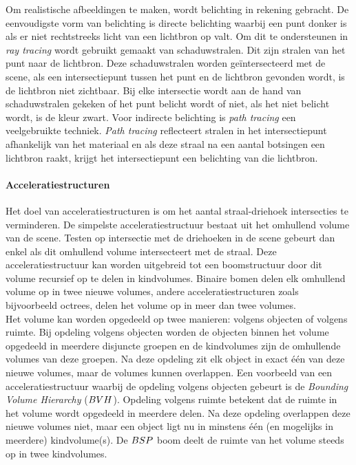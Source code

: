     Om realistische afbeeldingen te maken, wordt belichting in rekening gebracht. De eenvoudigste vorm van belichting is directe belichting waarbij een punt donker is als er niet rechtstreeks licht van een lichtbron op valt. Om dit te ondersteunen in \textit{ray tracing} wordt gebruikt gemaakt van schaduwstralen. Dit zijn stralen van het punt naar de lichtbron.  Deze schaduwstralen worden geïntersecteerd met de scene, als een intersectiepunt tussen het punt en de lichtbron gevonden wordt, is de lichtbron niet zichtbaar.  Bij elke intersectie wordt aan de hand van schaduwstralen gekeken of het punt belicht wordt of niet, als het niet belicht wordt, is de kleur zwart. Voor indirecte belichting is \textit{path tracing} een veelgebruikte techniek. \textit{Path tracing} reflecteert stralen in het intersectiepunt afhankelijk van het materiaal en als deze straal na een aantal botsingen een lichtbron raakt, krijgt het intersectiepunt een belichting van die lichtbron.    
    


    \paragraph{Acceleratiestructuren}
    Het doel van acceleratiestructuren is om het aantal straal-driehoek intersecties te verminderen.
    De simpelste acceleratiestructuur bestaat uit het omhullend volume van de scene.
    Testen op intersectie met de driehoeken in de scene gebeurt dan enkel als dit omhullend volume intersecteert met de straal.
    Deze acceleratiestructuur kan worden uitgebreid tot een boomstructuur door dit volume recursief op te delen in kindvolumes.
    Binaire bomen delen elk omhullend volume op in twee nieuwe volumes, andere acceleratiestructuren zoals bijvoorbeeld octrees, delen het volume op in meer dan twee volumes.
    \\

    Het volume kan worden opgedeeld op twee manieren: volgens objecten of volgens ruimte.
    Bij opdeling volgens objecten worden de objecten binnen het volume opgedeeld in meerdere disjuncte groepen en de kindvolumes zijn de omhullende volumes van deze groepen.
    Na deze opdeling zit elk object in exact één van deze nieuwe volumes, maar de volumes kunnen overlappen.
    Een voorbeeld van een acceleratiestructuur waarbij de opdeling volgens objecten gebeurt is de \textit{Bounding Volume Hierarchy} ($BVH$).
    Opdeling volgens ruimte betekent dat de ruimte in het volume wordt opgedeeld in meerdere delen.
    Na deze opdeling overlappen deze nieuwe volumes niet, maar een object ligt nu in minstens één (en mogelijks in meerdere) kindvolume(s).
    De $BSP$ boom deelt de ruimte van het volume steeds op in twee kindvolumes.


